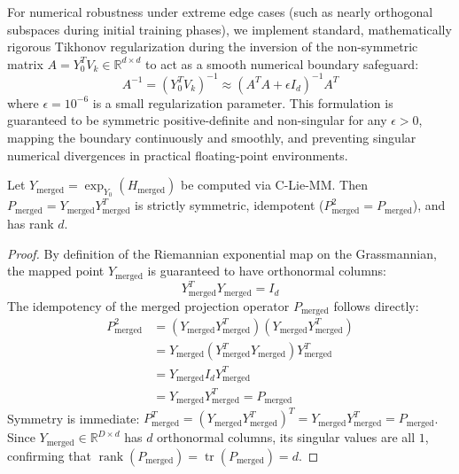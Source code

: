 For numerical robustness under extreme edge cases (such as nearly orthogonal subspaces during initial training phases), we implement standard, mathematically rigorous Tikhonov regularization during the inversion of the non-symmetric matrix $A = Y_0^T V_k \in \mathbb{R}^{d \times d}$ to act as a smooth numerical boundary safeguard:
\begin{equation}
    A^{-1} = (Y_0^T V_k)^{-1} \approx (A^T A + \epsilon I_d)^{-1} A^T
\end{equation}
where $\epsilon = 10^{-6}$ is a small regularization parameter. This formulation is guaranteed to be symmetric positive-definite and non-singular for any $\epsilon > 0$, mapping the boundary continuously and smoothly, and preventing singular numerical divergences in practical floating-point environments.

\begin{theorem}
\label{thm:preservation}
Let $Y_{\text{merged}} = \exp_{Y_0}(H_{\text{merged}})$ be computed via C-Lie-MM. Then $P_{\text{merged}} = Y_{\text{merged}} Y_{\text{merged}}^T$ is strictly symmetric, idempotent ($P_{\text{merged}}^2 = P_{\text{merged}}$), and has rank $d$.
\end{theorem}

\begin{proof}
By definition of the Riemannian exponential map on the Grassmannian, the mapped point $Y_{\text{merged}}$ is guaranteed to have orthonormal columns:
\begin{equation}
    Y_{\text{merged}}^T Y_{\text{merged}} = I_d
\end{equation}
The idempotency of the merged projection operator $P_{\text{merged}}$ follows directly:
\begin{align}
    P_{\text{merged}}^2 &= \left(Y_{\text{merged}} Y_{\text{merged}}^T\right) \left(Y_{\text{merged}} Y_{\text{merged}}^T\right) \\
    &= Y_{\text{merged}} \left(Y_{\text{merged}}^T Y_{\text{merged}}\right) Y_{\text{merged}}^T \\
    &= Y_{\text{merged}} I_d Y_{\text{merged}}^T \\
    &= Y_{\text{merged}} Y_{\text{merged}}^T = P_{\text{merged}}
\end{align}
Symmetry is immediate: $P_{\text{merged}}^T = (Y_{\text{merged}} Y_{\text{merged}}^T)^T = Y_{\text{merged}} Y_{\text{merged}}^T = P_{\text{merged}}$. Since $Y_{\text{merged}} \in \mathbb{R}^{D \times d}$ has $d$ orthonormal columns, its singular values are all $1$, confirming that $\operatorname{rank}(P_{\text{merged}}) = \operatorname{tr}(P_{\text{merged}}) = d$.
\end{proof}

